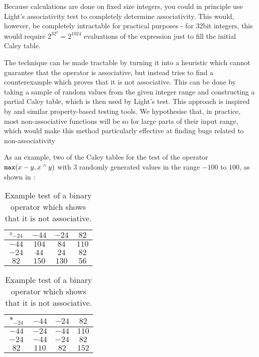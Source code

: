 Because calculations are done on fixed size integers, you could in principle use Light's
associativity test to completely determine associativity. This would, however, be
completely intractable for practical purposes - for 32bit integers, this would require
$2^{32^{2}} = 2^{1024}$ evaluations of the expression just to fill the initial Caley table.

The technique can be made tractable by turning it into a heuristic which cannot guarantee
that the operator is associative, but instead tries to find a counterexample which proves
that it is not associative. This can be done by taking a sample of random values from the
given integer range and constructing a partial Caley table, which is then used by Light's
test. This approach is inspired by \cite{quickcheck} and similar property-based testing
tools. We hypothesise that, in practice, most non-associative functions will be so for
large parts of their input range, which would make this method particularly effective at
finding bugs related to non-associativity

As an example, two of the Caley tables for the test of the operator $\texttt{max}(x - y, x \mathbin{^\wedge} y)$
with 3 randomly generated values in the range $-100$ to $100$, as shown in :

\begin{table}[h!]
  \def\arraystretch{1.2}
  \begin{tabular}{|c|ccc|}
    \hline
    $\circ_{-24}$ & $-44$ & $-24$ & $82$ \\
    \hline
        $-44$ & $104$ & $84$  & $110$ \\ 
        $-24$ & $44$  & $24$  & $82$  \\
        $82$  & $150$ & $130$ & $56$  \\
    \hline
  \end{tabular}
\quad
  \begin{tabular}{|c|ccc|}
    \hline
    $*_{-24}$ & $-44$ & $-24$ & $82$ \\
    \hline
        $-44$ & $-24$ & $-44$  & $110$ \\ 
        $-24$ & $-44$  & $-24$  & $82$  \\
        $82$  & $110$ & $82$ & $152$  \\
    \hline
  \end{tabular}
  \centering
  \caption{Example test of a binary operator which shows that it is not associative.}
  \label{table:assoc-test}
\end{table}
